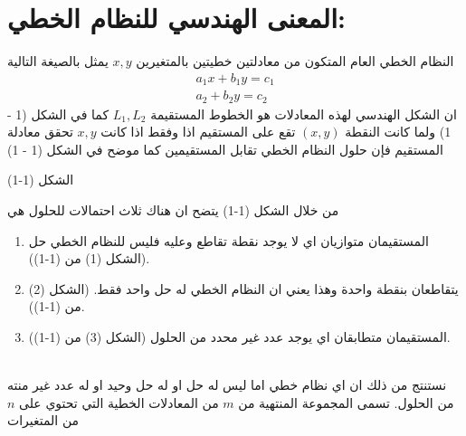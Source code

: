 \section[المعنى الهندسي للنظام الخطي]{المعنى الهندسي للنظام الخطي:}
النظام الخطي العام المتكون من معادلتين خطيتين بالمتغيرين $x,y$ يمثل بالصيغة التالية
\begin{gather*}
	a_1x + b_1 y = c_1\\
	a_2 + b_2 y = c_2
\end{gather*}
ان الشكل الهندسي لهذه المعادلات هو الخطوط المستقيمة $L_1, L_2$ كما في الشكل (1 - 1)
ولما كانت النقطة $(x, y)$ تقع على المستقيم اذا وفقط اذا كانت $x, y$ تحقق معادلة المستقيم فإن حلول النظام الخطي تقابل المستقيمين كما موضح في الشكل (1 - 1)
\begin{figure}[H]
	\centering
\end{figure}
\begin{center}
	الشكل (1-1)
\end{center}
من خلال الشكل (1-1) يتضح ان هناك ثلاث احتمالات للحلول هي
\begin{enumerate}
	\item المستقيمان متوازيان اي لا يوجد نقطة تقاطع وعليه فليس للنظام الخطي حل (الشكل (1) من (1-1)).
	\item يتقاطعان بنقطة واحدة وهذا يعني ان النظام الخطي له حل واحد فقط. (الشكل (2) من (1-1)).
	\item المستقيمان متطابقان اي يوجد عدد غير محدد من الحلول (الشكل (3) من (1-1)).
\end{enumerate}
\noindent
\\
نستنتج من ذلك ان اي نظام خطي اما ليس له حل او له حل وحيد او له عدد غير منته من الحلول. تسمى المجموعة المنتهية من $m$ من المعادلات الخطية التي تحتوي على $n$ من المتغيرات 
